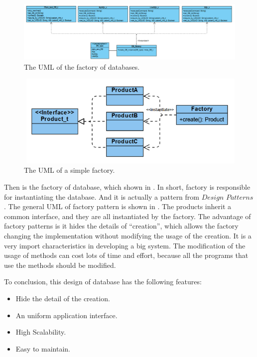 \documentclass{article}
\begin{document}
  \begin{figure}[ht]
    \centering
    \includegraphics[scale = 0.7]{asset/database/factory_UML.png}
    \caption{The UML of the factory of databases.}
    \label{fig:factory_UML}
  \end{figure}

  \begin{figure}[ht]
    \centering
    \includegraphics[scale = 0.5]{asset/database/simple_factory.png}
    \caption{The UML of a simple factory.}
    \label{fig:simple_factory}
  \end{figure}
  Then is the factory of database, which shown in . 
  In short, factory is responsible for instantiating the database. And it is actually 
  a pattern from $\textit{Design Patterns}$. 
  The general UML of factory pattern is shown in . The 
  products inherit a common interface, and they are all instantiated by the factory. 
  The advantage of factory patterns is it hides the details of ``creation'', which 
  allows the factory changing the implementation without modifying the usage of the 
  creation. It is a very import characteristics in developing a big system. The 
  modification of the usage of methods can cost lots of time and effort, because 
  all the programs that use the methods should be modified. 
  
  To conclusion, this design of database has the following features:
  \begin{itemize}
    \item Hide the detail of the creation. 
    \item An uniform application interface. 
    \item High Scalability. 
    \item Easy to maintain. 
  \end{itemize}
\end{document}
